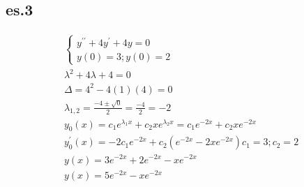 \documentclass{article}
\begin{document}
\subsection{es.3}
\begin{equation*}
	\begin{matrix}
		\begin{cases}
			y^{\prime\prime}+4y^\prime+4y=0\\
			y(0)=3; y(0)=2
		\end{cases}\\
		\lambda^2+4\lambda+4=0\\
		\Delta=4^2-4(1)(4)=0\\
		\lambda_{1,2}=\frac{-4\pm\sqrt{0}}{2}=\frac{-4}{2}=-2\\
		y_0(x)=c_1e^{\lambda_1x}+c_2xe^{\lambda_2x} =c_1e^{-2x}+c_2xe^{-2x}\\
		y_0^\prime(x)=-2c_1e^{-2x}+c_2(e^{-2x}-2xe^{-2x})
		c_1=3;c_2=2\\
		y(x)=3e^{-2x}+2e^{-2x}-xe^{-2x}\\
		y(x)=5e^{-2x}-xe^{-2x}
	\end{matrix}
\end{equation*}
\end{document}

